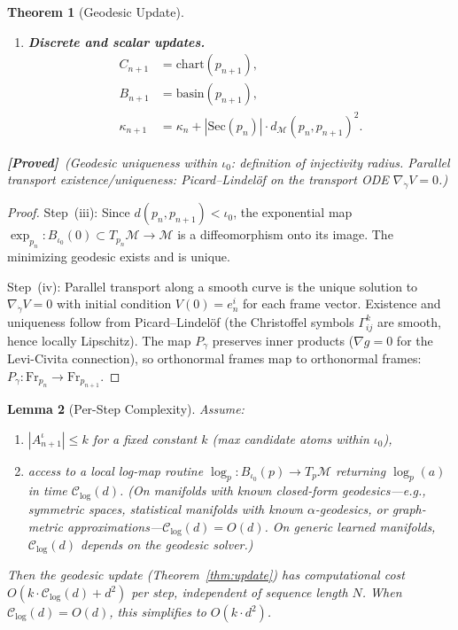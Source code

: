 \documentclass[11pt,a4paper]{article}
\newtheorem{theorem}{Theorem}[section]
\newtheorem{lemma}[theorem]{Lemma}
\theoremstyle{definition}
\theoremstyle{remark}
\newcommand{\Fr}{\mathrm{Fr}}
\newcommand{\Sec}{\mathrm{Sec}}
\newcommand{\statusproved}{\textcolor{green!50!black}{\textbf{[Proved]}}}
\begin{document}
\begin{theorem}[Geodesic Update]
\begin{enumerate}[label=(\roman*),nosep]
    \item \textbf{Discrete and scalar updates.}
    \begin{align}
        C_{n+1} &= \mathrm{chart}(p_{n+1}), 
        \label{eq:chart_update} \\
        B_{n+1} &= \mathrm{basin}(p_{n+1}), 
        \label{eq:basin_update} \\
        \kappa_{n+1} &= \kappa_n + |\Sec(p_n)| \cdot 
        d_{\mathcal{M}}(p_n, p_{n+1})^2. 
        \label{eq:kappa_step}
    \end{align}
\end{enumerate}
\statusproved\ (Geodesic uniqueness within $\iota_0$: definition 
of injectivity radius. Parallel transport existence/uniqueness: 
Picard--Lindel\"of on the transport ODE 
$\nabla_{\dot\gamma} V = 0$.)
\end{theorem}

\begin{proof}
Step~(iii): Since $d(p_n, p_{n+1}) < \iota_0$, the exponential map 
$\exp_{p_n} : B_{\iota_0}(0) \subset T_{p_n}\mathcal{M} \to 
\mathcal{M}$ is a diffeomorphism onto its image. The minimizing 
geodesic exists and is unique.

Step~(iv): Parallel transport along a smooth curve is the unique 
solution to $\nabla_{\dot\gamma} V = 0$ with initial condition 
$V(0) = e_n^i$ for each frame vector. Existence and uniqueness 
follow from Picard--Lindel\"of (the Christoffel symbols 
$\Gamma^k_{ij}$ are smooth, hence locally Lipschitz). The map 
$P_\gamma$ preserves inner products ($\nabla g = 0$ for the 
Levi-Civita connection), so orthonormal frames map to orthonormal 
frames: $P_\gamma : \Fr_{p_n} \to \Fr_{p_{n+1}}$.
\end{proof}


\begin{lemma}[Per-Step Complexity]\label{lem:complexity}
Assume:
\begin{enumerate}[nosep,label=(\alph*)]
    \item $|A_{n+1}^{\iota}| \leq k$ for a fixed constant $k$ 
    (max candidate atoms within $\iota_0$),
    \item access to a local log-map routine 
    $\log_p : B_{\iota_0}(p) \to T_p\mathcal{M}$ returning 
    $\log_p(a)$ in time $\mathcal{C}_{\log}(d)$. (On manifolds 
    with known closed-form geodesics---e.g., symmetric spaces, 
    statistical manifolds with known $\alpha$-geodesics, or 
    graph-metric approximations---$\mathcal{C}_{\log}(d) = O(d)$. 
    On generic learned manifolds, $\mathcal{C}_{\log}(d)$ 
    depends on the geodesic solver.)
\end{enumerate}
Then the geodesic update (Theorem~\ref{thm:update}) has 
computational cost $O(k \cdot \mathcal{C}_{\log}(d) + d^2)$ 
per step, independent of sequence length $N$. When 
$\mathcal{C}_{\log}(d) = O(d)$, this simplifies to 
$O(k \cdot d^2)$.
\end{lemma}
\end{document}
